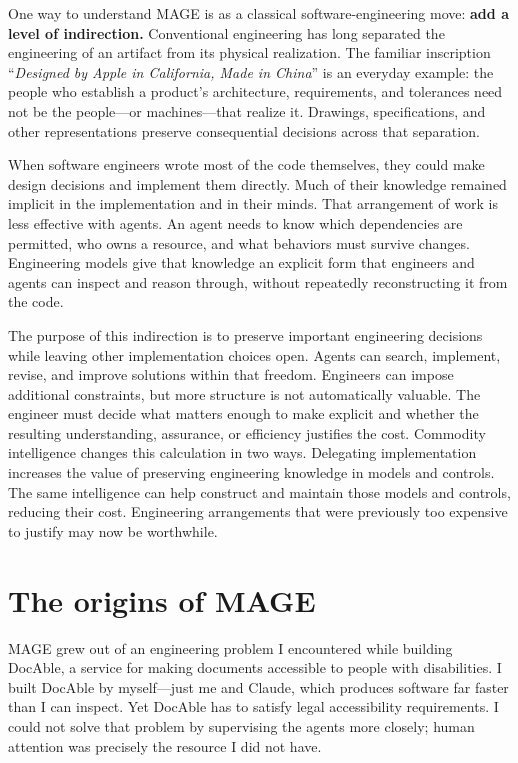 One way to understand MAGE is as a classical software-engineering move:
\textbf{add a level of indirection.}
Conventional engineering has long separated the engineering of an
artifact from its physical realization. The familiar inscription ``\textit{Designed by Apple in California, Made in China}'' is an everyday example: the people who
establish a product's architecture, requirements, and tolerances need
not be the people---or machines---that realize it. Drawings,
specifications, and other representations preserve consequential
decisions across that separation.

When software engineers wrote most of the code themselves, they could
make design decisions and implement them directly. Much of their
knowledge remained implicit in the implementation and in their minds. 
That arrangement of work is less effective with agents. An agent needs to know
which dependencies are permitted, who owns a resource, and what behaviors
must survive changes. Engineering models give that knowledge an explicit
form that engineers and agents can inspect and reason through, without
repeatedly reconstructing it from the code.

The purpose of this indirection is to preserve important engineering
decisions while leaving other implementation choices open. Agents can
search, implement, revise, and improve solutions within that freedom.
Engineers can impose additional constraints, but more structure is not automatically valuable. 
The engineer must decide what matters enough to make explicit and whether the resulting understanding,
assurance, or efficiency justifies the cost. Commodity intelligence changes this calculation in two ways. Delegating implementation increases the value of preserving engineering knowledge in models and controls. The same intelligence can help construct and maintain those models and controls, reducing their cost. Engineering arrangements that were previously too expensive to justify may now be worthwhile.

\section{The origins of MAGE}\label{heading:where-the-theory-came-from}

MAGE grew out of an engineering problem I encountered while building
DocAble, a service for making documents accessible to people with
disabilities. I built DocAble by myself---just me and Claude, which
produces software far faster than I can inspect. Yet DocAble 
has to satisfy legal accessibility requirements. I could
not solve that problem by supervising the agents more closely; human
attention was precisely the resource I did not have.

